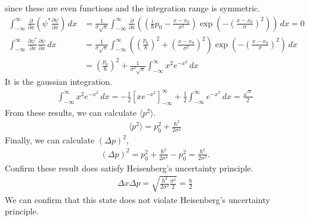 \documentclass[floatfix,nofootinbib,superscriptaddress,fleqn]{revtex4}
\begin{document}
\begin{itemize}
since these are even functions 
and the integration range is symmetric.
  \begin{align}   
    \int_{-\infty}^{\infty} \frac{\partial}{\partial x}
     \left(\psi^* \frac{\partial \psi}{\partial x}
     \right) \,dx 
     &=\frac{1}{\sigma\sqrt{\pi}}\int_{-\infty}^{\infty}\frac{\partial}{\partial x}
      \left(\left(\frac{i}{\hbar}p_0-\frac{x-x_0}{\sigma^2}\right)
      \exp\left(-{\left(\frac{x-x_0}{\sigma}\right)}^2
      \right)\right)\,dx = 0 \\
    \int_{-\infty}^{\infty}
    \frac{\partial \psi^*}{\partial x}\frac{\partial \psi}{\partial x} \,dx 
      &=\frac{1}{\sigma\sqrt{\pi}}\int_{-\infty}^{\infty}
      \left(\left(\frac{p_0}{\hbar}\right)^2
      +\left(\frac{x-x_0}{\sigma^2}\right)^2\right)\exp
      \left(-{\left(\frac{x-x_0}{\sigma} \right)}^2\right)\,dx \\
     &=\left(\frac{p_0}{\hbar}\right)^2
     +\frac{1}{\sigma^2\sqrt{\pi}}\int_{-\infty}^{\infty} x^2e^{-x^2}\,dx
  \end{align}
It is the gaussian integration.
  \begin{align}
    \int_{-\infty}^{\infty} x^2e^{-x^2}\,dx 
    =-\frac{1}{2}\left[xe^{-x^2}\right]^{\infty}_{-\infty}
    +\frac{1}{2}\int_{-\infty}^{\infty} e^{-x^2}\,dx 
    =\frac{\sqrt{\pi}}{2}
  \end{align}
From these results, we can calculate $\langle p^2 \rangle$.
  \begin{align}
    \langle p^2 \rangle = p_0^2+\frac{\hbar^2}{2\sigma^2}
  \end{align}
Finally, we can calculate $\left( \Delta p \right)^2$,
  \begin{align}
    \left( \Delta p \right)^2 = p_0^2 + \frac{\hbar^2}{2\sigma^2} - p_0^2 
    = \frac{\hbar^2}{2\sigma^2}.
  \end{align}
Confirm these result does satisfy Heisenberg's uncertainty principle.
  \begin{align}
    \Delta x \Delta p = \sqrt{\frac{\hbar^2}{2\sigma^2}\frac{\sigma^2}{2}} 
    = \frac{\hbar}{2}
  \end{align}
We can confirm that this state does not violate Heisenberg's uncertainty principle.

\end{itemize}
\vspace{1cm}
\end{document}
